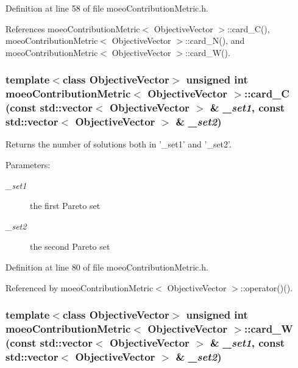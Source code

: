 Definition at line 58 of file moeo\-Contribution\-Metric.h.

References moeo\-Contribution\-Metric$<$ Objective\-Vector $>$::card\_\-C(), moeo\-Contribution\-Metric$<$ Objective\-Vector $>$::card\_\-N(), and moeo\-Contribution\-Metric$<$ Objective\-Vector $>$::card\_\-W().
\subsubsection{\setlength{\rightskip}{0pt plus 5cm}template$<$class Objective\-Vector$>$ unsigned int \bf{moeo\-Contribution\-Metric}$<$ \bf{Objective\-Vector} $>$::card\_\-C (const std::vector$<$ \bf{Objective\-Vector} $>$ \& {\em \_\-set1}, const std::vector$<$ \bf{Objective\-Vector} $>$ \& {\em \_\-set2})\hspace{0.3cm}{\tt  [inline, private]}}\label{classmoeoContributionMetric_4e60849763aaad0cdea66e71edf2d29e}


Returns the number of solutions both in '\_\-set1' and '\_\-set2'. 

\begin{Desc}
\item[Parameters:]
\begin{description}
\item[{\em \_\-set1}]the first Pareto set \item[{\em \_\-set2}]the second Pareto set \end{description}
\end{Desc}


Definition at line 80 of file moeo\-Contribution\-Metric.h.

Referenced by moeo\-Contribution\-Metric$<$ Objective\-Vector $>$::operator()().
\subsubsection{\setlength{\rightskip}{0pt plus 5cm}template$<$class Objective\-Vector$>$ unsigned int \bf{moeo\-Contribution\-Metric}$<$ \bf{Objective\-Vector} $>$::card\_\-W (const std::vector$<$ \bf{Objective\-Vector} $>$ \& {\em \_\-set1}, const std::vector$<$ \bf{Objective\-Vector} $>$ \& {\em \_\-set2})\hspace{0.3cm}{\tt  [inline, private]}}\label{classmoeoContributionMetric_68d6d1ec1ed0bed1ea290cdacb93b5b2}


